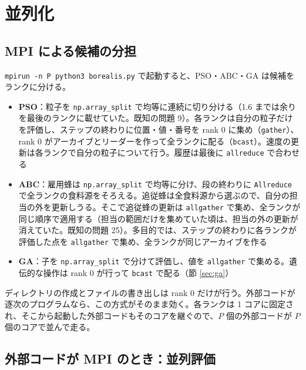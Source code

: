\documentclass[11pt,a4paper,dvipdfmx]{jsarticle}
\begin{document}
\section{並列化}\label{sec:parallel}

\subsection{MPI による候補の分担}

\texttt{mpirun -n P python3 borealis.py} で起動すると、PSO・ABC・GA は候補をランクに分ける。

\begin{itemize}
\item \textbf{PSO}：粒子を \texttt{np.array\_split} で均等に連続に切り分ける（1.6 までは余りを最後のランクに載せていた。既知の問題 9）。各ランクは自分の粒子だけを評価し、ステップの終わりに位置・値・番号を rank 0 に集め（\texttt{gather}）、rank 0 がアーカイブとリーダーを作って全ランクに配る（\texttt{bcast}）。速度の更新は各ランクで自分の粒子について行う。履歴は最後に \texttt{allreduce} で合わせる
\item \textbf{ABC}：雇用蜂は \texttt{np.array\_split} で均等に分け、段の終わりに \texttt{Allreduce} で全ランクの食料源をそろえる。追従蜂は全食料源から選ぶので、自分の担当の外を更新しうる。そこで追従蜂の更新は \texttt{allgather} で集め、全ランクが同じ順序で適用する（担当の範囲だけを集めていた頃は、担当の外の更新が消えていた。既知の問題 25）。多目的では、ステップの終わりに各ランクが評価した点を \texttt{allgather} で集め、全ランクが同じアーカイブを作る
\end{itemize}

\begin{itemize}
\item \textbf{GA}：子を \texttt{np.array\_split} で分けて評価し、値を \texttt{allgather} で集める。遺伝的な操作は rank 0 が行って \texttt{bcast} で配る（節 \ref{sec:ga}）
\end{itemize}

ディレクトリの作成とファイルの書き出しは rank 0 だけが行う。外部コードが逐次のプログラムなら、この方式がそのまま効く。各ランクは 1 コアに固定され、そこから起動した外部コードもそのコアを継ぐので、$P$ 個の外部コードが $P$ 個のコアで並んで走る。

\subsection{外部コードが MPI のとき：並列評価}\label{sec:parallel-eval}
\end{document}
